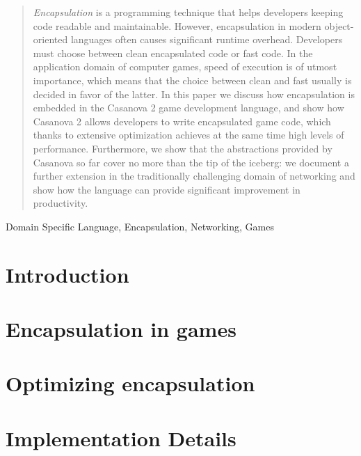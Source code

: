 \documentclass[preprint,12pt]{elsarticle}
\begin{document}
\begin{frontmatter}



\begin{abstract}
\textit{Encapsulation} is a programming technique that helps developers keeping code readable and maintainable. However, encapsulation in modern object-oriented languages often causes significant runtime overhead. Developers must choose between clean encapsulated code or fast code. In the application domain of computer games, speed of execution is of utmost importance, which means that the choice between clean and fast usually is decided in favor of the latter. In this paper we discuss how encapsulation is embedded in the Casanova 2 game development language, and show how Casanova 2 allows developers to write encapsulated game code, which thanks to extensive optimization achieves at the same time high levels of performance. Furthermore, we show that the abstractions provided by Casanova so far cover no more than the tip of the iceberg: we document a further extension in the traditionally challenging domain of networking and show how the language can provide significant improvement in productivity.
\end{abstract}

\begin{keyword}
Domain Specific Language, Encapsulation, Networking, Games
\end{keyword}

\end{frontmatter}


\section{Introduction}
\label{sec:introduction}


\section{Encapsulation in games}
\label{sec:the_problem}


\section{Optimizing encapsulation}
\label{sec:idea}


\section{Implementation Details}
\label{sec:details}

\end{document}
